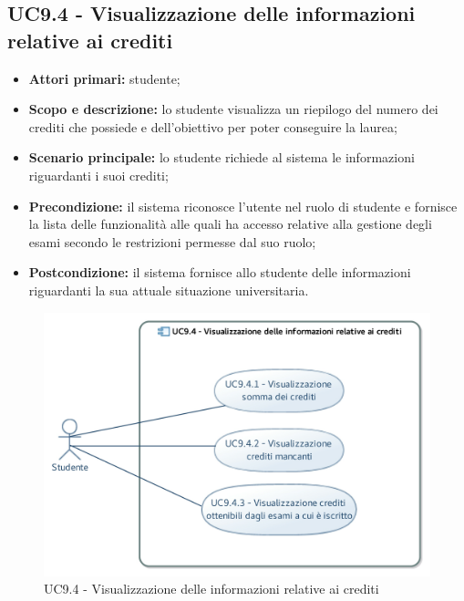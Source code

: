 \documentclass[AnalisiDeiRequisiti.tex]{subfiles}
\begin{document}
\subsection{UC9.4 - Visualizzazione delle informazioni relative ai crediti}
\begin{itemize}
	\item \textbf{Attori primari:} studente;
	\item \textbf{Scopo e descrizione:} lo studente visualizza un riepilogo del numero dei crediti che possiede e dell'obiettivo per poter conseguire la laurea;
	\item \textbf{Scenario principale:} lo studente richiede al sistema le informazioni riguardanti i suoi crediti;
	\item \textbf{Precondizione:} il sistema riconosce l'utente nel ruolo di studente e fornisce la lista delle funzionalità alle quali ha accesso relative alla gestione degli esami secondo le restrizioni permesse dal suo ruolo; 
	\item \textbf{Postcondizione:} il sistema fornisce allo studente delle informazioni riguardanti la sua attuale situazione universitaria.
\end{itemize}
\begin{figure}[H]
	\centering
	\includegraphics[width=1.0\linewidth]{UC9_4.jpg}
	\caption{UC9.4 - Visualizzazione delle informazioni relative ai crediti}
	\label{fig:UC9.4 - Visualizzazione delle informazioni relative ai crediti}
\end{figure}
\end{document}
